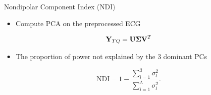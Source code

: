 \documentclass{beamer}
\begin{document}
	\begin{frame}{Nondipolar Component Index (NDI)}
		
		\begin{itemize}
				\item Compute PCA on the preprocessed ECG
		\end{itemize}

		\begin{equation}
			{\bf Y}_{TQ} = {\bf U} {\bf \Sigma} {\bf V}^T
		\end{equation}

		\begin{itemize}
			\item The proportion of power not explained by the 3 dominant PCs
	\end{itemize}

		\begin{equation}
			\text{NDI} = 1 - \frac{\sum_{l=1}^{3} \sigma_{l}^2}{\sum_{l=1}^{L} \sigma_{l}^2}.
		\end{equation}

	\end{frame}
\end{document}
